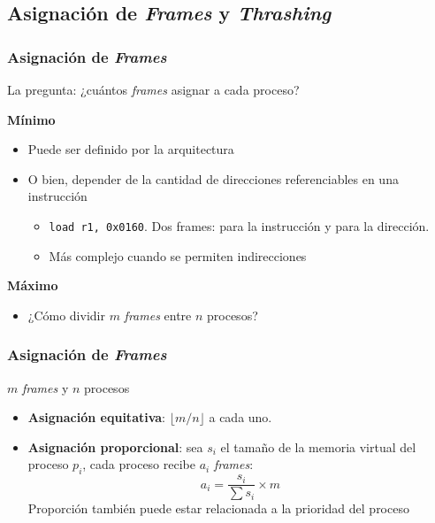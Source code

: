 \documentclass[letter]{beamer}
\begin{document}
\subsection{Asignación de {\em Frames} y {\em Thrashing}}

\begin{frame}
  \frametitle{Asignación de {\em Frames}}

  La pregunta: ¿cuántos {\em frames} asignar a cada proceso?
  
  {\bf Mínimo}
  \begin{itemize}
    \item Puede ser definido por la arquitectura
    \item O bien, depender de la cantidad de direcciones referenciables en una instrucción
      \begin{itemize}
        \item {\tt load r1, 0x0160}. Dos frames: para la instrucción y para la dirección.
        \item Más complejo cuando se permiten indirecciones
      \end{itemize}
  \end{itemize}
  
  {\bf Máximo}
  \begin{itemize}
    \item ¿Cómo dividir $m$ {\em frames} entre $n$ procesos?
  \end{itemize}

\end{frame}

\begin{frame}
  \frametitle{Asignación de {\em Frames}}

  $m$ {\em frames} y $n$ procesos
  \begin{itemize}
    \item {\bf Asignación equitativa}: $\lfloor m/n \rfloor$ a cada uno. 
    \item {\bf Asignación proporcional}: sea $s_i$ el tamaño de la memoria virtual del proceso $p_i$,
          cada proceso recibe $a_i$ {\em frames}: 
          \[ a_i = \frac{s_i}{\sum{s_i}} \times m \]
          Proporción también puede estar relacionada a la prioridad del proceso
          
  \end{itemize}

\end{frame}
\end{document}
